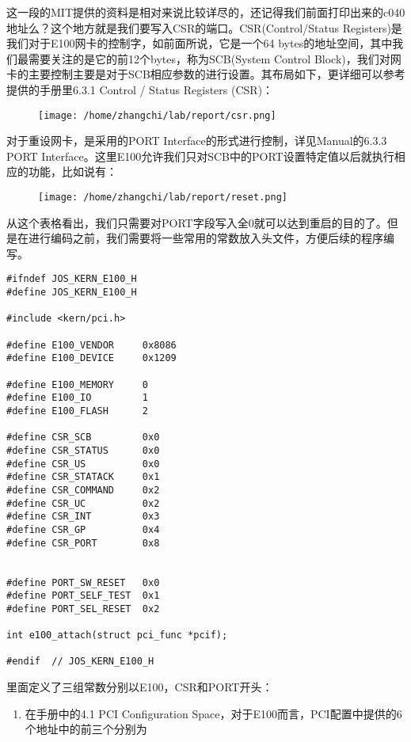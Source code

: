 \documentclass{article}
\begin{document}
\begin{CJK*}{UTF8}{gkai}
这一段的MIT提供的资料是相对来说比较详尽的，还记得我们前面打印出来的c040地址么？这个地方就是我们要写入CSR的端口。CSR(Control/Status Registers)是我们对于E100网卡的控制字，如前面所说，它是一个64 bytes的地址空间，其中我们最需要关注的是它的前12个bytes，称为SCB(System Control Block)，我们对网卡的主要控制主要是对于SCB相应参数的进行设置。其布局如下，更详细可以参考提供的手册里6.3.1 Control / Status Registers (CSR)：

\begin{figure}[htp]
\centering
\texttt{[image: /home/zhangchi/lab/report/csr.png]}
\end{figure}

对于重设网卡，是采用的PORT Interface的形式进行控制，详见Manual的6.3.3 PORT Interface。这里E100允许我们只对SCB中的PORT设置特定值以后就执行相应的功能，比如说有：


\begin{figure}[htp]
\centering
\texttt{[image: /home/zhangchi/lab/report/reset.png]}
\end{figure}

从这个表格看出，我们只需要对PORT字段写入全0就可以达到重启的目的了。但是在进行编码之前，我们需要将一些常用的常数放入头文件，方便后续的程序编写。

\begin{lstlisting}[style=ccode, title={\scriptsize \ttfamily \bfseries kern/e1000.h}]
#ifndef JOS_KERN_E100_H
#define JOS_KERN_E100_H

#include <kern/pci.h>

#define E100_VENDOR		0x8086
#define E100_DEVICE		0x1209

#define E100_MEMORY     0
#define E100_IO         1
#define E100_FLASH      2

#define CSR_SCB         0x0
#define CSR_STATUS      0x0
#define CSR_US          0x0
#define CSR_STATACK     0x1
#define CSR_COMMAND     0x2
#define CSR_UC          0x2
#define CSR_INT         0x3
#define CSR_GP          0x4
#define CSR_PORT        0x8


#define PORT_SW_RESET   0x0
#define PORT_SELF_TEST  0x1
#define PORT_SEL_RESET  0x2

int e100_attach(struct pci_func *pcif);

#endif	// JOS_KERN_E100_H
\end{lstlisting}

里面定义了三组常数分别以E100，CSR和PORT开头：

\begin{enumerate}
\item{在手册中的4.1 PCI Configuration Space，对于E100而言，PCI配置中提供的6个地址中的前三个分别为

}
\end{enumerate}
\end{CJK*}
\end{document}
